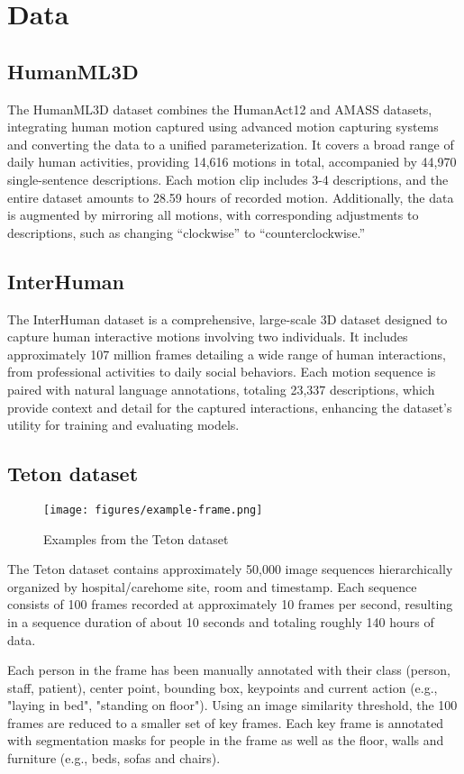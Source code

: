 \chapter{Data}
\section{HumanML3D}
The HumanML3D dataset combines the HumanAct12 and AMASS datasets, integrating human motion captured using advanced motion capturing systems and converting the data to a unified parameterization. It covers a broad range of daily human activities, providing 14,616 motions in total, accompanied by 44,970 single-sentence descriptions. Each motion clip includes 3-4 descriptions, and the entire dataset amounts to 28.59 hours of recorded motion. Additionally, the data is augmented by mirroring all motions, with corresponding adjustments to descriptions, such as changing “clockwise” to “counterclockwise.”


\section{InterHuman}
The InterHuman dataset is a comprehensive, large-scale 3D dataset designed to capture human interactive motions involving two individuals. It includes approximately 107 million frames detailing a wide range of human interactions, from professional activities to daily social behaviors. Each motion sequence is paired with natural language annotations, totaling 23,337 descriptions, which provide context and detail for the captured interactions, enhancing the dataset’s utility for training and evaluating models.

\section{Teton dataset}
\begin{figure}[H]
    \centering
    \texttt{[image: figures/example-frame.png]}
    \caption{Examples from the Teton dataset}
\end{figure}
The Teton dataset contains approximately 50,000 image sequences hierarchically organized by hospital/carehome site, room and timestamp. Each sequence consists of 100 frames recorded at approximately 10 frames per second, resulting in a sequence duration of about 10 seconds and totaling roughly 140 hours of data. 

Each person in the frame has been manually annotated with their class (person, staff, patient), center point, bounding box, keypoints and current action (e.g., "laying in bed", "standing on floor"). Using an image similarity threshold, the 100 frames are reduced to a smaller set of key frames. Each key frame is annotated with segmentation masks for people in the frame as well as the floor, walls and furniture (e.g., beds, sofas and chairs).

